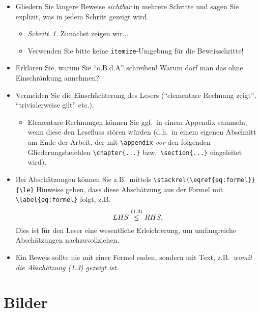 {\begin{itemize}
\item Gliedern Sie längere Beweise \emph{sichtbar} in mehrere Schritte und sagen Sie explizit, was in jedem Schritt gezeigt wird.
\begin{itemize}
\item \emph{Schritt~1.} Zunächst zeigen wir...
\item Verwenden Sie bitte keine \verb$itemize$-Umgebung für die Beweisschritte!
\end{itemize}

\item Erklären Sie, warum Sie "`o.B.d.A"' schreiben! Warum darf man das ohne Einschrän\-kung annehmen?

\item Vermeiden Sie die Einschüchterung des Lesers ("`elementare Rechnung zeigt"', "`trivialerweise gilt"' etc.).
\begin{itemize}
\item Elementare Rechnungen können Sie ggf.\ in einem Appendix sammeln, wenn diese den Lesefluss stören würden (d.h.\ in einem eigenen Abschnitt am Ende der Arbeit, der mit \verb$\appendix$ \emph{vor} den folgenden Gliederungsbefehlen \verb$\chapter{...}$ bzw.\ \verb$\section{...}$ eingeleitet wird).
\end{itemize}

\item Bei Abschätzungen können Sie z.B.\ mittels \verb$\stackrel{\eqref{eq:formel}}{\le}$ Hinweise geben, dass diese Abschätzung aus der Formel mit \verb$\label{eq:formel}$ folgt, z.B. 
$$LHS \stackrel{\normalfont(1.2)}{\le} RHS.$$ 
Dies ist für den Leser eine wesentliche Erleichterung, um umfangreiche Abschätzungen nachzuvollziehen.

\item Ein Beweis sollte nie mit einer Formel enden, sondern mit Text, z.B.\ \emph{womit die Abschätzung {\normalfont(1.3)} gezeigt ist.}
\end{itemize}
}

\section{Bilder}

